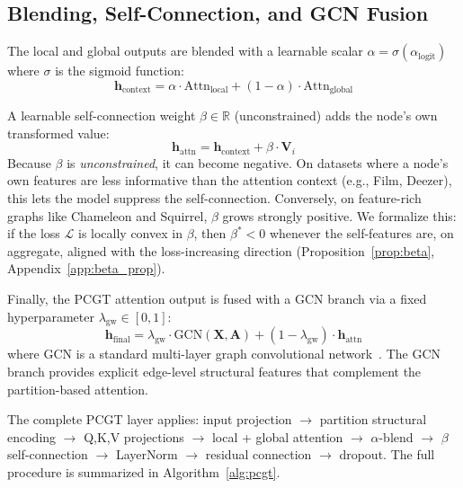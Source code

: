 \documentclass[sigconf]{acmart}
\begin{document}
\subsection{Blending, Self-Connection, and GCN Fusion}

The local and global outputs are blended with a learnable scalar $\alpha = \sigma(\alpha_{\text{logit}})$ where $\sigma$ is the sigmoid function:
\begin{equation}
\mathbf{h}_{\text{context}} = \alpha \cdot \text{Attn}_{\text{local}} + (1 - \alpha) \cdot \text{Attn}_{\text{global}}
\end{equation}

A learnable self-connection weight $\beta \in \mathbb{R}$ (unconstrained) adds the node's own transformed value:
\begin{equation}
\mathbf{h}_{\text{attn}} = \mathbf{h}_{\text{context}} + \beta \cdot \mathbf{V}_i
\end{equation}
Because $\beta$ is \emph{unconstrained}, it can become negative. On datasets where a node's own features are less informative than the attention context (e.g., Film, Deezer), this lets the model suppress the self-connection. Conversely, on feature-rich graphs like Chameleon and Squirrel, $\beta$ grows strongly positive. We formalize this: if the loss $\mathcal{L}$ is locally convex in $\beta$, then $\beta^* < 0$ whenever the self-features are, on aggregate, aligned with the loss-increasing direction (Proposition~\ref{prop:beta}, Appendix~\ref{app:beta_prop}).

Finally, the PCGT attention output is fused with a GCN branch via a fixed hyperparameter $\lambda_{\text{gw}} \in [0,1]$:
\begin{equation}
\mathbf{h}_{\text{final}} = \lambda_{\text{gw}} \cdot \text{GCN}(\mathbf{X}, \mathbf{A}) + (1 - \lambda_{\text{gw}}) \cdot \mathbf{h}_{\text{attn}}
\end{equation}
where GCN is a standard multi-layer graph convolutional network~\citep{kipf2017semi}. The GCN branch provides explicit edge-level structural features that complement the partition-based attention.

The complete PCGT layer applies: input projection $\to$ partition structural encoding $\to$ Q,K,V projections $\to$ local + global attention $\to$ $\alpha$-blend $\to$ $\beta$ self-connection $\to$ LayerNorm $\to$ residual connection $\to$ dropout. The full procedure is summarized in Algorithm~\ref{alg:pcgt}.
\end{document}
